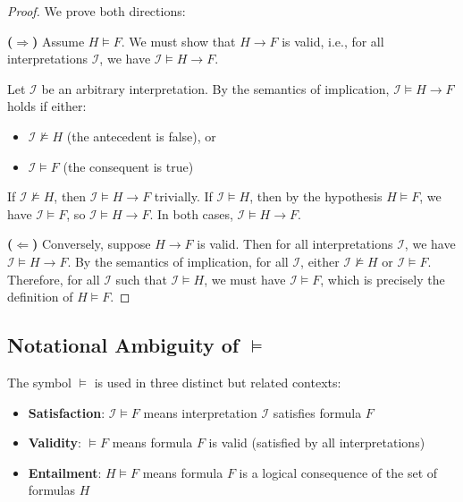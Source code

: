 \documentclass[11pt,a4paper]{article}
\theoremstyle{definition}
\theoremstyle{plain}
\theoremstyle{remark}
\begin{document}
\begin{proof}
We prove both directions:

\textbf{($\Rightarrow$)} Assume $H \models F$. We must show that $H \rightarrow F$ is valid, i.e., for all interpretations $\mathcal{I}$, we have $\mathcal{I} \models H \rightarrow F$.

Let $\mathcal{I}$ be an arbitrary interpretation. By the semantics of implication, $\mathcal{I} \models H \rightarrow F$ holds if either:
\begin{itemize}
    \item $\mathcal{I} \not\models H$ (the antecedent is false), or
    \item $\mathcal{I} \models F$ (the consequent is true)
\end{itemize}

If $\mathcal{I} \not\models H$, then $\mathcal{I} \models H \rightarrow F$ trivially. If $\mathcal{I} \models H$, then by the hypothesis $H \models F$, we have $\mathcal{I} \models F$, so $\mathcal{I} \models H \rightarrow F$. In both cases, $\mathcal{I} \models H \rightarrow F$.

\textbf{($\Leftarrow$)} Conversely, suppose $H \rightarrow F$ is valid. Then for all interpretations $\mathcal{I}$, we have $\mathcal{I} \models H \rightarrow F$. By the semantics of implication, for all $\mathcal{I}$, either $\mathcal{I} \not\models H$ or $\mathcal{I} \models F$. Therefore, for all $\mathcal{I}$ such that $\mathcal{I} \models H$, we must have $\mathcal{I} \models F$, which is precisely the definition of $H \models F$.
\end{proof}

\subsection{Notational Ambiguity of $\models$}

The symbol $\models$ is used in three distinct but related contexts:

\begin{itemize}
    \item \textbf{Satisfaction}: $\mathcal{I} \models F$ means interpretation $\mathcal{I}$ satisfies formula $F$
    \item \textbf{Validity}: $\models F$ means formula $F$ is valid (satisfied by all interpretations)
    \item \textbf{Entailment}: $H \models F$ means formula $F$ is a logical consequence of the set of formulas $H$
\end{itemize}
\end{document}

